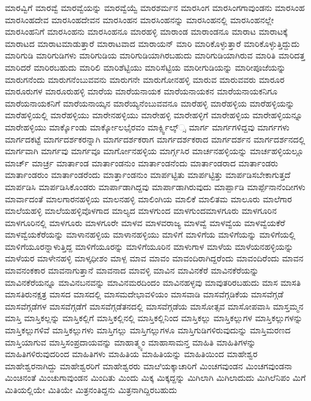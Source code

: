 {ಮಾರವ್ವಿಗೆ
ಮಾರವ್ವೆ
ಮಾರವ್ವೆಯನ್ನು
ಮಾರವ್ವೆಯ್ವೆ
ಮಾರಶರ್ಮನ
ಮಾರಸಿಂಗ
ಮಾರಸಿಂಗಗಾವುಂಡನು
ಮಾರಸಿಂಹ
ಮಾರಸಿಂಹದೇವ
ಮಾರಸಿಂಹದೇವನ
ಮಾರಸಿಂಹನ
ಮಾರಸಿಂಹನನ್ನು
ಮಾರಸಿಂಹನಲ್ಲಿ
ಮಾರಸಿಂಹನಲ್ಲೇ
ಮಾರಸಿಂಹನಿಗೆ
ಮಾರಸಿಂಹನು
ಮಾರಸಿಂಹನೂ
ಮಾರಹಳ್ಳಿ
ಮಾರಾಂಡ
ಮಾರಾಂಡನೂ
ಮಾರಾಟ
ಮಾರಾಟಕ್ಕೆ
ಮಾರಾಟದ
ಮಾರಾಟಮಾಡುತ್ತಾರೆ
ಮಾರಾಟವಾದ
ಮಾರಾಯನ್
ಮಾರಿ
ಮಾರಿಕೊಳ್ಳುತ್ತಾರೆ
ಮಾರಿಕೊಳ್ಳುತ್ತಿದ್ದುದು
ಮಾರಿಗುಡಿ
ಮಾರಿಗುಡಿಗಳು
ಮಾರಿಗುಡಿಯ
ಮಾರಿಗುಡಿಯಾಗಿರಬಹುದು
ಮಾರಿಗುಡಿಯಾಗಿರುವ
ಮಾರಿತಿ
ಮಾರಿದತ್ತ
ಮಾರಿದರೆ
ಮಾರಿರಬಹುದು
ಮಾರಿಲಿ
ಮಾರಿಶೆಟ್ಟಿಯು
ಮಾರಿಸೆಟ್ಟಿಯ
ಮಾರೀಗುಡಿಯನ್ನು
ಮಾರೀಪೂಜೆಯನ್ನು
ಮಾರುಗನೆಂದು
ಮಾರುಗನೆಂಬುವವನು
ಮಾರುಗನೇ
ಮಾರುಗೋನಹಳ್ಳಿ
ಮಾರುವ
ಮಾರುವವರು
ಮಾರೂರ
ಮಾರೂರುಗಳ
ಮಾರೂರುಹಳ್ಳಿ
ಮಾರೆಯ
ಮಾರೆಯನಾಯಕ
ಮಾರೆಯನಾಯಕನ
ಮಾರೆಯನಾಯಕನಿಗೂ
ಮಾರೆಯನಾಯಕನಿಗೆ
ಮಾರೆಯನಾಯ್ಕನ
ಮಾರೆಯ್ಯನೆಂಬುವವನೂ
ಮಾರೆಹಳ್ಳಿ
ಮಾರೆಹಳ್ಳಿಯ
ಮಾರೆಹಳ್ಳಿಯನ್ನು
ಮಾರೆಹಳ್ಳಿಯಲ್ಲಿ
ಮಾರೆಹಳ್ಳಿಯು
ಮಾರೇನಹಳ್ಳಿಯು
ಮಾರೇಹಳ್ಳಿ
ಮಾರೇಹಳ್ಳಿಗೆ
ಮಾರೇಹಳ್ಳಿಯ
ಮಾರೇಹಳ್ಳಿಯನ್ನೂ
ಮಾರೇಹಳ್ಳಿಯು
ಮಾರ್ಕ್ಕೊಂಡು
ಮಾರ್ಕ್ಕೋಲಭೈರವಂ
ಮಾರ್ಕ್ಸ್ವಿಲ್ಕ್್ಸ
ಮಾರ್ಗ
ಮಾರ್ಗಗಳಿದ್ದವು
ಮಾರ್ಗಗಳು
ಮಾರ್ಗದಕಟ್ಟೆ
ಮಾರ್ಗದರ್ಶಕರನ್ನಾಗಿ
ಮಾರ್ಗದರ್ಶಕರಾಗ
ಮಾರ್ಗದರ್ಶಕರಾದ
ಮಾರ್ಗದರ್ಶನ
ಮಾರ್ಗದರ್ಶನದಲ್ಲಿ
ಮಾರ್ಗವಾಗಿ
ಮಾರ್ಗವು
ಮಾರ್ಗವೂ
ಮಾರ್ಗೋನಹಳ್ಳಿಯ
ಮಾರ್ಗ್ಗಸಿರ
ಮಾರ್ಚನಹಳ್ಳಿಯನ್ನು
ಮಾರ್ಚಹಳ್ಳಿಯಲ್ಲೂ
ಮಾರ್ಚ್
ಮಾರ್ಚ್ರ
ಮಾರ್ತಾಂಡ
ಮಾರ್ತಾಂಡನುಂ
ಮಾರ್ತಾಂಡನೆಂದು
ಮಾರ್ತಾಂಡರಾದ
ಮಾರ್ತಾಂಡರು
ಮಾರ್ತಾಂಡರುಂ
ಮಾರ್ತಾಂಡರೆಂದು
ಮಾರ್ತ್ತಾಂಡನುಂ
ಮಾರ್ಪಟ್ಟಿತು
ಮಾರ್ಪಟ್ಟಿತ್ತು
ಮಾರ್ಪಡಿಸಬೇಕಾಗುತ್ತದೆ
ಮಾರ್ಪಡಿಸಿ
ಮಾರ್ಪಡಿಸಿಕೊಂಡರು
ಮಾರ್ಪಾಡಾಗಿದ್ದವು
ಮಾರ್ಪಾಡಾಗಿರುವುದು
ಮಾರ್ಪ್ಪಾಡಿ
ಮಾರ್ಪ್ಪೆನಾನೆಂದೀಗಳು
ಮಾರ್ವಾದಂತೆ
ಮಾಲಗಾರನಹಳ್ಳಿಯ
ಮಾಲನಹಳ್ಳಿ
ಮಾಲಿಂಗಿಯ
ಮಾಲಿಕೆ
ಮಾಲಿತಮ
ಮಾಲೂರು
ಮಾಲೆಗಾರ
ಮಾಲೆಯಹಳ್ಳಿ
ಮಾಲೆಯಹಳ್ಳಿವೊಳಗಾದ
ಮಾಲ್ಯದ
ಮಾಳಗುಂದ
ಮಾಳಗುಂದಮಾಳಗೂರು
ಮಾಳಗೂರಿನ
ಮಾಳಗೂರಿನಲ್ಲಿ
ಮಾಳಗೂರು
ಮಾಳಗೂರೇ
ಮಾಳವ
ಮಾಳವರಾಜ್ಯ
ಮಾಳವ್ವೆ
ಮಾಳವ್ವೆಯ
ಮಾಳವ್ವೆಯಕೆರೆ
ಮಾಳವ್ವೆಯಕೆರೆಯನ್ನು
ಮಾಳಾನಹಳ್ಳಿಯ
ಮಾಳಾನಹಳ್ಳಿಯು
ಮಾಳಿಗೆ
ಮಾಳಿಗೆಯ
ಮಾಳಿಗೆಯನ್ನು
ಮಾಳಿಗೆಯಲ್ಲಿ
ಮಾಳಿಗೆಯೂರನ್ನಾಳುತ್ತಿದ್ದ
ಮಾಳಿಗೆಯೂರನ್ನು
ಮಾಳಿಗೆಯೂರಿನ
ಮಾಳುಗಾಳ
ಮಾಳೆಯ
ಮಾಳೆಯನಹಳ್ಳಿಯನ್ನು
ಮಾಳೆಯರ
ಮಾಳೇನಹಳ್ಳಿ
ಮಾಳ್ಕಧೀಶಂ
ಮಾಳ್ಪ
ಮಾವ
ಮಾವಂ
ಮಾವಂದಿರಾಗಿದ್ದರೆಂದು
ಮಾವಂದಿರೆಂದು
ಮಾವನ
ಮಾವನಂಕಕಾರ
ಮಾವನಾಗುತ್ತಾನೆ
ಮಾವನಾದ
ಮಾವಳ್ಳಿ
ಮಾವಿನ
ಮಾವಿನಕೆರೆ
ಮಾವಿನಕೆರೆಯನ್ನು
ಮಾವಿನಕೆರೆಯನ್ನೂ
ಮಾವಿನಬನವನ್ನು
ಮಾವಿನಮರದಿಂದಂ
ಮಾವಿನಹಳ್ಳವು
ಮಾವುತರಿರಬಹುದು
ಮಾಸ
ಮಾಸತಿ
ಮಾಸತಿರುನಕ್ಷತ್ರ
ಮಾಸದ
ಮಾಸದಲ್ಲಿ
ಮಾಸಮದೇಭಾವಳಿಯಂ
ಮಾಸವಾಡಿ
ಮಾಸವೆಗ್ಗಡಿಕೆಯ
ಮಾಸವೆಗ್ಗಡೆ
ಮಾಸವೆಗ್ಗಡೆಗಳ
ಮಾಸವೆಗ್ಗಡೆಗೆ
ಮಾಸವೆಗ್ಗಡೆತನದಲ್ಲಿ
ಮಾಸವೆಗ್ಗಡೆಯ
ಮಾಸೋತ್ಸವ
ಮಾಸೋಪವಾಸಿ
ಮಾಸ್ತಮ್ಮನ
ಮಾಸ್ತಿ
ಮಾಸ್ತಿಕಲ್ಲನ್ನು
ಮಾಸ್ತಿಕಲ್ಲಿಗೆ
ಮಾಸ್ತಿಕಲ್ಲಿನಲ್ಲಿ
ಮಾಸ್ತಿಕಲ್ಲಿನಿಂದ
ಮಾಸ್ತಿಕಲ್ಲು
ಮಾಸ್ತಿಕಲ್ಲುಗಳ
ಮಾಸ್ತಿಕಲ್ಲುಗಳನ್ನು
ಮಾಸ್ತಿಕಲ್ಲುಗಳಿವೆ
ಮಾಸ್ತಿಕಲ್ಲುಗಳು
ಮಾಸ್ತಿಗಲ್ಲು
ಮಾಸ್ತಿಗಲ್ಲುಗಳೂ
ಮಾಸ್ತಿಗುಡಿಗಳಿರುವುದುನ್ನು
ಮಾಸ್ತಿಮರಣದ
ಮಾಸ್ತಿಯಾಗುವ
ಮಾಸ್ತಿಸಂಪ್ರದಾಯವನ್ನು
ಮಾಹಾತ್ಮ್ಯಂ
ಮಾಹಾಸಾಮನ್ತ
ಮಾಹಿತಿ
ಮಾಹಿತಿಗಳನ್ನು
ಮಾಹಿತಿಗಳಿರುವುದರಿಂದ
ಮಾಹಿತಿಗಳು
ಮಾಹಿತಿಯ
ಮಾಹಿತಿಯನ್ನು
ಮಾಹಿತಿಯಿಂದ
ಮಾಹೇಶ್ವರ
ಮಾಹೇಶ್ವರನಾಗಿದ್ದು
ಮಾಹೇಶ್ವರರಿಗೆ
ಮಾಹೇಶ್ವರರು
ಮಾೞಿಯಕ್ಕಾಚಾರಿಗೆ
ಮಿಂಚಗವುಂಡನ
ಮಿಂಚಗವುಂಡನಾ
ಮಿಂಚಿನಂತೆ
ಮಿಂಚುಗಾವುಂಡನ
ಮಿಂದಿತು
ಮಿಂದು
ಮಿಕ್ಕ
ಮಿಕ್ಕದ್ದನ್ನು
ಮಿಗಿಲಾಗಿ
ಮಿಗಿಲಾದುದು
ಮಿಗಿಲೆನಿಪಂ
ಮಿಗೆ
ಮಿತಿಯಲ್ಲಿಯೇ
ಮಿತಿಯೇ
ಮಿತ್ರನಂತಿದ್ದನು
ಮಿತ್ರನಾಗಿದ್ದಿರಬಹುದು
}
